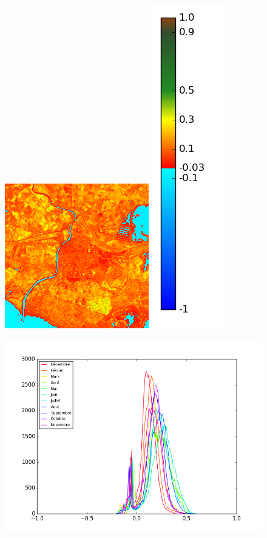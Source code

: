 \documentclass{book}
\begin{document}
\begin{figure}[H]
{\includegraphics[scale=0.4]{images/Agde/12_ndvi.png}
\includegraphics[scale=0.2]{images/colormap.png}
}
\begin{center}
\includegraphics[scale=0.45]{images/Agde/all_ndvi_histo.png}

\end{center}
\end{figure}
\end{document}
